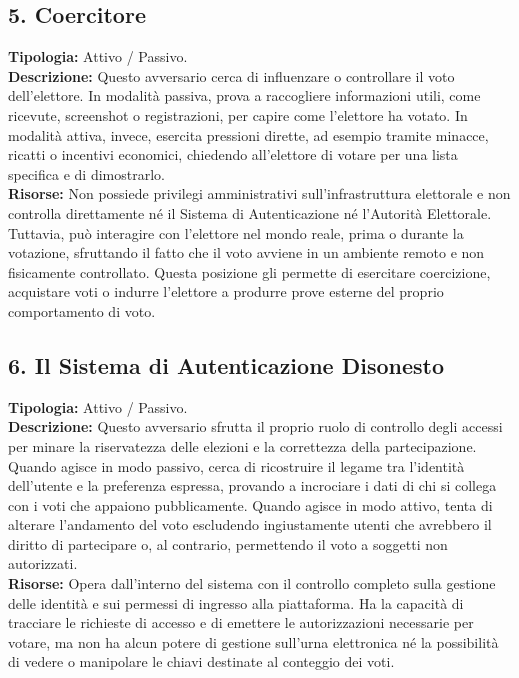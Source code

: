 \subsection*{5. Coercitore}
\textbf{Tipologia:} Attivo / Passivo. \\
\textbf{Descrizione:} Questo avversario cerca di influenzare o controllare il voto dell'elettore. In modalità passiva, prova a raccogliere informazioni utili, come ricevute, screenshot o registrazioni, per capire come l'elettore ha votato. In modalità attiva, invece, esercita pressioni dirette, ad esempio tramite minacce, ricatti o incentivi economici, chiedendo all'elettore di votare per una lista specifica e di dimostrarlo. \\
\textbf{Risorse:} Non possiede privilegi amministrativi sull'infrastruttura elettorale e non controlla direttamente né il Sistema di Autenticazione né l'Autorità Elettorale. Tuttavia, può interagire con l'elettore nel mondo reale, prima o durante la votazione, sfruttando il fatto che il voto avviene in un ambiente remoto e non fisicamente controllato. Questa posizione gli permette di esercitare coercizione, acquistare voti o indurre l'elettore a produrre prove esterne del proprio comportamento di voto.


\subsection*{6. Il Sistema di Autenticazione Disonesto}
\textbf{Tipologia:} Attivo / Passivo. \\
\textbf{Descrizione:} Questo avversario sfrutta il proprio ruolo di controllo degli accessi per minare la riservatezza delle elezioni e la correttezza della partecipazione. Quando agisce in modo passivo, cerca di ricostruire il legame tra l'identità dell'utente e la preferenza espressa, provando a incrociare i dati di chi si collega con i voti che appaiono pubblicamente. Quando agisce in modo attivo, tenta di alterare l'andamento del voto escludendo ingiustamente utenti che avrebbero il diritto di partecipare o, al contrario, permettendo il voto a soggetti non autorizzati. \\
\textbf{Risorse:} Opera dall'interno del sistema con il controllo completo sulla gestione delle identità e sui permessi di ingresso alla piattaforma. Ha la capacità di tracciare le richieste di accesso e di emettere le autorizzazioni necessarie per votare, ma non ha alcun potere di gestione sull'urna elettronica né la possibilità di vedere o manipolare le chiavi destinate al conteggio dei voti.

